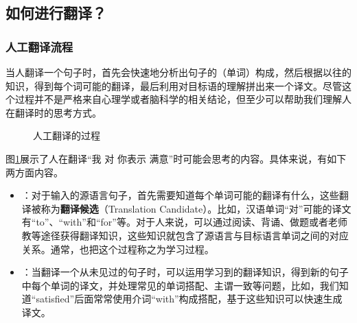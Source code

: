 \subsection{如何进行翻译？}


\subsubsection*{人工翻译流程}

\parinterval 当人翻译一个句子时，首先会快速地分析出句子的（单词）构成，然后根据以往的知识，得到每个词可能的翻译，最后利用对目标语的理解拼出来一个译文。尽管这个过程并不是严格来自心理学或者脑科学的相关结论，但至少可以帮助我们理解人在翻译时的思考方式。

\begin{figure}[htp]
    \centering

    \caption{人工翻译的过程}
    \label{fig:3-3}
\end{figure}
\vspace{-0.2em}

\parinterval 图\ref{fig:3-3}展示了人在翻译``我 对 你表示 满意''时可能会思考的内容。具体来说，有如下两方面内容。

\begin{itemize}
\vspace{0.5em}
\item {\small{}}：对于输入的源语言句子，首先需要知道每个单词可能的翻译有什么，这些翻译被称为{\small\sffamily\bfseries{翻译候选}}（Translation Candidate）。比如，汉语单词``对''可能的译文有``to''、``with''和``for''等。对于人来说，可以通过阅读、背诵、做题或者老师教等途径获得翻译知识，这些知识就包含了源语言与目标语言单词之间的对应关系。通常，也把这个过程称之为学习过程。
\vspace{0.5em}
\item {\small{}}：当翻译一个从未见过的句子时，可以运用学习到的翻译知识，得到新的句子中每个单词的译文，并处理常见的单词搭配、主谓一致等问题，比如，我们知道``satisfied''后面常常使用介词``with''构成搭配，基于这些知识可以快速生成译文。
\vspace{0.5em}
\end{itemize}

